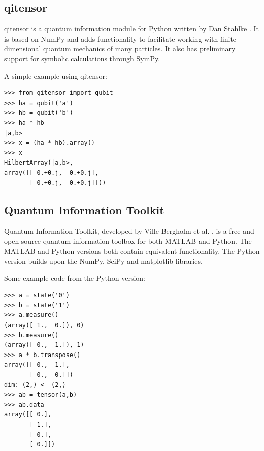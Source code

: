 \subsection{qitensor}
qitensor is a quantum information module for Python written by Dan Stahlke \cite{qitensor}. It is based on NumPy and adds functionality to facilitate working with finite dimensional quantum mechanics of many particles. It also has preliminary support for symbolic calculations through SymPy.
\par A simple example using qitensor:
\begin{verbatim}
>>> from qitensor import qubit
>>> ha = qubit('a')
>>> hb = qubit('b')
>>> ha * hb
|a,b>
>>> x = (ha * hb).array()
>>> x
HilbertArray(|a,b>,
array([[ 0.+0.j,  0.+0.j],
       [ 0.+0.j,  0.+0.j]]))
\end{verbatim}

\subsection{Quantum Information Toolkit}
Quantum Information Toolkit, developed by Ville Bergholm et al. \cite{quantuminformationtoolkit}, is a free and open source quantum information toolbox for both MATLAB and Python. The MATLAB and Python versions both contain equivalent functionality. The Python version builds upon the NumPy, SciPy and matplotlib libraries.
\par Some example code from the Python version:
\begin{verbatim}
>>> a = state('0')
>>> b = state('1')
>>> a.measure()
(array([ 1.,  0.]), 0)
>>> b.measure()
(array([ 0.,  1.]), 1)
>>> a * b.transpose() 
array([[ 0.,  1.],
       [ 0.,  0.]])
dim: (2,) <- (2,)
>>> ab = tensor(a,b)
>>> ab.data
array([[ 0.],
       [ 1.],
       [ 0.],
       [ 0.]])
\end{verbatim}

